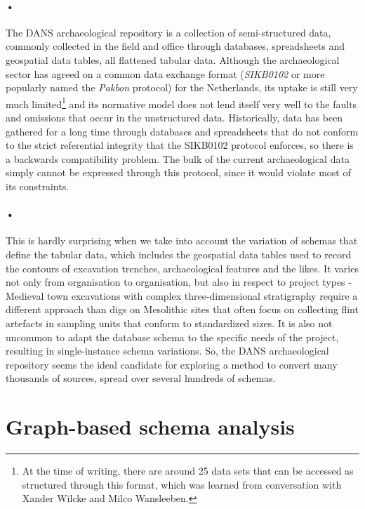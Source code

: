 \documentclass[12pt,twoside,a4paper]{article}
\begin{document}
\paragraph{•}
The DANS archaeological repository is a collection of semi-structured data, commonly collected in the field and office through databases, spreadsheets and geospatial data tables, all flattened tabular data. 
Although the archaeological sector has agreed on a common data exchange format (\textit{SIKB0102} or more popularly named the \textit{Pakbon} protocol)\cite{digitaal-werken-in-de-archeologie} for the Netherlands, its uptake is still very much limited\footnote{At the time of writing, there are around 25 data sets that can be accessed as structured through this format, which was learned from conversation with Xander Wilcke and Milco Wansleeben.} and its normative model does not lend itself very well to the faults and omissions that occur in the unstructured data. 
Historically, data has been gathered for a long time through databases and spreadsheets that do not conform to the strict referential integrity that the SIKB0102 protocol enforces, so there is a backwards compatibility problem. 
The bulk of the current archaeological data simply cannot be expressed through this protocol, since it would violate most of its constraints.
\paragraph{•}
This is hardly surprising when we take into account the variation of schemas that define the tabular data, which includes the geospatial data tables used to record the contours of excavation trenches, archaeological features and the likes. 
It varies not only from organisation to organisation, but also in respect to project types - Medieval town excavations with complex three-dimensional stratigraphy require a different approach than digs on Mesolithic sites that often focus on collecting flint artefacts in sampling units that conform to standardized sizes. 
It is also not uncommon to adapt the database schema to the specific needs of the project, resulting in single-instance schema variations. 
So, the DANS archaeological repository seems the ideal candidate for exploring a method to convert many thousands of sources, spread over several hundreds of schemas. 
\section{Graph-based schema analysis}
\end{document}
